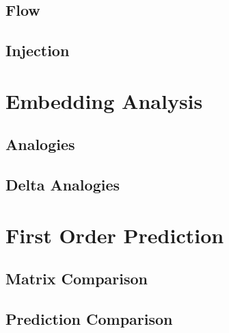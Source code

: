 
\subsection{Flow}


\subsection{Injection}

\section{Embedding Analysis}

\subsection{Analogies}
\subsection{Delta Analogies}

\section{First Order Prediction}

\subsection{Matrix Comparison}
\subsection{Prediction Comparison}